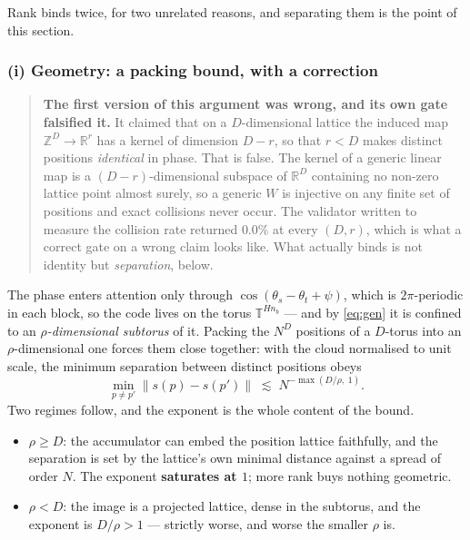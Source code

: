 \documentclass[11pt]{article}
\newcommand{\R}{\mathbb{R}}
\newcommand{\Z}{\mathbb{Z}}
\newcommand{\nb}{n_b}
\begin{document}
Rank binds twice, for two unrelated reasons, and separating them is the point of
this section.

\subsubsection*{(i) Geometry: a packing bound, with a correction}

\begin{quote}\small
\textbf{The first version of this argument was wrong, and its own gate falsified
it.} It claimed that on a $D$-dimensional lattice the induced map $\Z^{D}\to\R^{r}$
has a kernel of dimension $D-r$, so that $r<D$ makes distinct positions
\emph{identical} in phase. That is false. The kernel of a generic linear map is a
$(D-r)$-dimensional subspace of $\R^{D}$ containing no non-zero lattice point
almost surely, so a generic $W$ is injective on any finite set of positions and
exact collisions never occur. The validator written to measure the collision rate
returned $0.0\%$ at every $(D,r)$, which is what a correct gate on a wrong claim
looks like. What actually binds is not identity but \emph{separation}, below.
\end{quote}

\noindent The phase enters attention only through $\cos(\theta_s-\theta_t+\psi)$,
which is $2\pi$-periodic in each block, so the code lives on the torus
$\mathbb{T}^{H\nb}$ --- and by \eqref{eq:gen} it is confined to an
\emph{$\rho$-dimensional subtorus} of it. Packing the $N^{D}$ positions of a
$D$-torus into an $\rho$-dimensional one forces them close together: with the
cloud normalised to unit scale, the minimum separation between distinct positions
obeys
\begin{equation}
  \label{eq:packing}
  \boxed{\;\min_{p\neq p'}\left\lVert s(p)-s(p')\right\rVert
   \;\lesssim\; N^{-\max\left(D/\rho,\;1\right)}. \;}
\end{equation}
Two regimes follow, and the exponent is the whole content of the bound.
\begin{itemize}\itemsep2pt
\item $\rho \ge D$: the accumulator can embed the position lattice faithfully, and
  the separation is set by the lattice's own minimal distance against a spread of
  order $N$. The exponent \textbf{saturates at $1$}; more rank buys nothing
  geometric.
\item $\rho < D$: the image is a projected lattice, dense in the subtorus, and the
  exponent is $D/\rho > 1$ --- strictly worse, and worse the smaller $\rho$ is.
\end{itemize}
\end{document}
